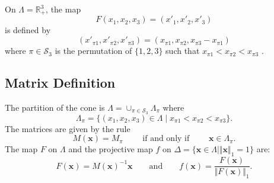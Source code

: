 On $\Lambda=\mathbb{R}^3_+$, the map
\[
F (x_1,x_2,x_3) = (x'_1,x'_2,x'_3)
\]
is defined by
\[
    (x'_{\pi 1}, x'_{\pi 2}, x'_{\pi 3}) =
    (x_{\pi 1}, x_{\pi 2}, x_{\pi 3}-x_{\pi 1})
\]
where $\pi\in\mathcal{S}_3$ is the permutation of $\{1,2,3\}$ such that
$x_{\pi 1}<x_{\pi 2}<x_{\pi 3}$
\cite{MR0130852}.
\subsection{Matrix Definition}
The partition of the cone is
$\Lambda=\cup_{\pi\in\mathcal{S}_3}\Lambda_\pi$ where
\[
    \Lambda_\pi = \{(x_1,x_2,x_3)\in\Lambda\mid 
	x_{\pi 1}< x_{\pi 2}< x_{\pi 3}\}.
\]
The matrices are given by the rule
\[
    M(\mathbf{x}) = M_\pi
    \qquad\text{ if and only if }\qquad
    \mathbf{x}\in\Lambda_\pi.
\]
The map $F$ on $\Lambda$ and
the projective map $f$ on
$\Delta=\{\mathbf{x}\in\Lambda\mid\Vert\mathbf{x}\Vert_1=1\}$ are:
\[
    F(\mathbf{x}) = M(\mathbf{x})^{-1}\mathbf{x}
    \qquad\text{and}\qquad
    f(\mathbf{x}) = \frac{F(\mathbf{x})}{\Vert F(\mathbf{x})\Vert_1}.
\]
